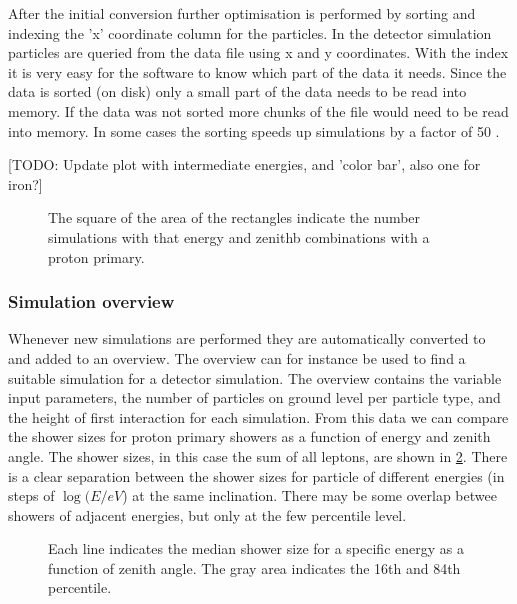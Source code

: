 After the initial conversion further optimisation is performed by sorting and indexing the 'x' coordinate column for the particles. In the detector simulation particles are queried from the \corsika data file using x and y coordinates. With the index it is very easy for the software to know which part of the data it needs. Since the data is sorted (on disk) only a small part of the data needs to be read into memory. If the data was not sorted more chunks of the file would need to be read into memory. In some cases the sorting speeds up simulations by a factor of 50 \cite{pytables:optimization}.

[TODO: Update plot with intermediate energies, and 'color bar', also one for iron?]

\begin{figure}
    \centering
    
    \caption{ The square of the area of the rectangles indicate the number simulations with that energy and zenithb combinations with a proton primary.}
    \label{fig:simulations_proton_energy_zenith}
\end{figure}


\subsubsection{Simulation overview}

Whenever new simulations are performed they are automatically converted to \hdf and added to an overview. The overview can for instance be used to find a suitable \corsika simulation for a detector simulation. The overview contains the variable input parameters, the number of particles on ground level per particle type, and the height of first interaction for each simulation. From this data we can compare the shower sizes for proton primary showers as a function of energy and zenith angle. The shower sizes, in this case the sum of all leptons, are shown in \cref{fig:simulations_shower_sizes}. There is a clear separation between the shower sizes for particle of different energies (in steps of $\log(E/\si{eV}$) at the same inclination. There may be some overlap betwee showers of adjacent energies, but only at the few percentile level.

\begin{figure}
    \centering
    
    \caption{             Each line indicates the median shower size for a specific energy as a function of zenith angle. The gray area indicates the 16th and 84th percentile.}
    \label{fig:simulations_shower_sizes}
\end{figure}


